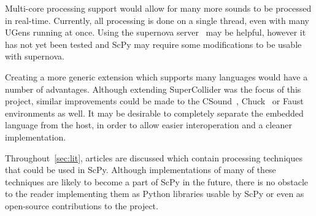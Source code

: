 \documentclass{article}
\begin{document}
Multi-core processing support would allow for many more sounds to be processed in real-time.
Currently, all processing is done on a single thread, even with many UGens running at once. Using
the supernova server~\cite{blechmann2005supernova} may be helpful, however it has not yet been
tested and ScPy may require some modifications to be usable with supernova.

Creating a more generic extension which supports many languages would have a number of advantages.
Although extending SuperCollider was the focus of this project, similar improvements could be made
to the CSound~\cite{boulanger2000csound,lazzarini2005extensions}, Chuck~\cite{wang2008chuck} or
Faust~\cite{orlarey2009faust} environments as well. It may be desirable to completely separate the
embedded language from the host, in order to allow easier interoperation and a cleaner
implementation.

Throughout~\autoref{sec:lit}, articles are discussed which contain processing techniques that could
be used in ScPy. Although implementations of many of these techniques are likely to become a part
of ScPy in the future, there is no obstacle to the reader implementing them as Python libraries
usable by ScPy or even as open-source contributions to the project.

\newpage\printbibliography{}
\end{document}
